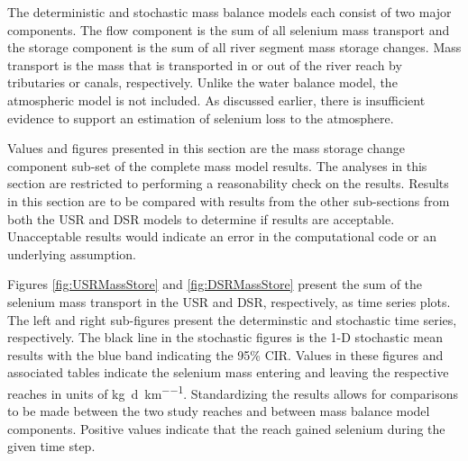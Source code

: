 \begin{linenumbers}
The deterministic and stochastic mass balance models each consist of two major components.  The flow component is the sum of all selenium mass transport and the storage component is the sum of all river segment mass storage changes.  Mass transport is the mass that is transported in or out of the river reach by tributaries or canals, respectively.  Unlike the water balance model, the atmospheric model is not included.  As discussed earlier, there is insufficient evidence to support an estimation of selenium loss to the atmosphere.

Values and figures presented in this section are the mass storage change component sub-set of the complete mass model results.  The analyses in this section are restricted to performing a reasonability check on the results.  Results in this section are to be compared with results from the other sub-sections from both the USR and DSR models to determine if results are acceptable.  Unacceptable results would indicate an error in the computational code or an underlying assumption.

Figures \ref{fig:USRMassStore} and \ref{fig:DSRMassStore} present the sum of the selenium mass transport in the USR and DSR, respectively, as time series plots.  The left and right sub-figures present the determinstic and stochastic time series, respectively.  The black line in the stochastic figures is the 1-D stochastic mean results with the blue band indicating the 95\% CIR.  Values in these figures and associated tables indicate the selenium mass entering and leaving the respective reaches in units of \si{\kilo\gram\per\day\per\kilo\meter}.  Standardizing the results allows for comparisons to be made between the two study reaches and between mass balance model components.  Positive values indicate that the reach gained selenium during the given time step.


\end{linenumbers}
